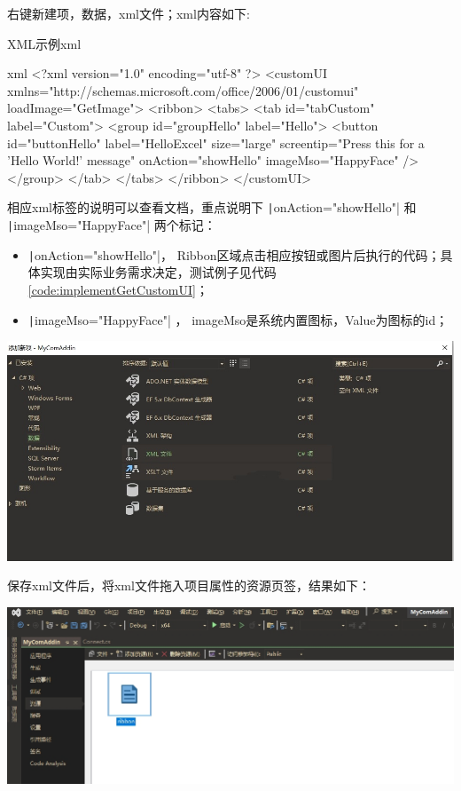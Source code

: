 \documentclass[math,code]{amznotes}
\begin{document}
	右键新建项，数据，xml文件；xml内容如下:
	\begin{codebox}{XML示例}{xml}
	\begin{amzcode}{xml}
		<?xml version="1.0" encoding="utf-8" ?>
		<customUI xmlns="http://schemas.microsoft.com/office/2006/01/customui" loadImage="GetImage">
			<ribbon>
				<tabs>
					<tab id="tabCustom" label="Custom">
						<group id="groupHello" label="Hello">
							<button id="buttonHello" label="HelloExcel" size="large" screentip="Press this for a 'Hello World!' message" onAction="showHello" imageMso="HappyFace" />
						</group>
					</tab>
				</tabs>
			</ribbon>
		</customUI>		
	\end{amzcode}
	\end{codebox}
	相应xml标签的说明可以查看文档，重点说明下 \texttt|onAction="showHello"| 和 \texttt|imageMso="HappyFace"| 两个标记：
	\begin{itemize}[noitemsep]
		\item \texttt|onAction="showHello"|，
		 Ribbon区域点击相应按钮或图片后执行的代码；具体实现由实际业务需求决定，测试例子见代码\ref{code:implementGetCustomUI}；
		\item \texttt|imageMso="HappyFace"| ，
		imageMso是系统内置图标，Value为图标的id；
	\end{itemize}
	
	\includegraphics[width=0.9\linewidth]{pic/new_xml}	
	
	保存xml文件后，将xml文件拖入项目属性的资源页签，结果如下：
	
	\includegraphics[width=0.9\linewidth]{pic/resource}
	
\end{document}

